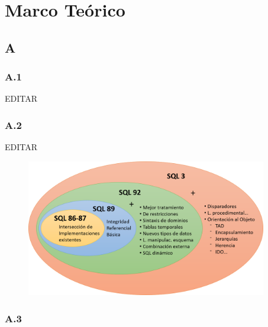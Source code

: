 \documentclass[preprint,12pt]{elsarticle}
\begin{document}



\section{Marco Teórico}


\subsection {\textbf{A}}

\subsubsection{\textbf{A.1}}

EDITAR \cite{SQLne}  %

\subsubsection{\textbf{A.2}}

EDITAR

\begin{figure}[htb]
	\begin{center}
		\includegraphics[width=10.5cm]{./IMAGENES/evolucion} %
	\end{center}
\end{figure}


\subsubsection{\textbf{A.3}}
\end{document}
